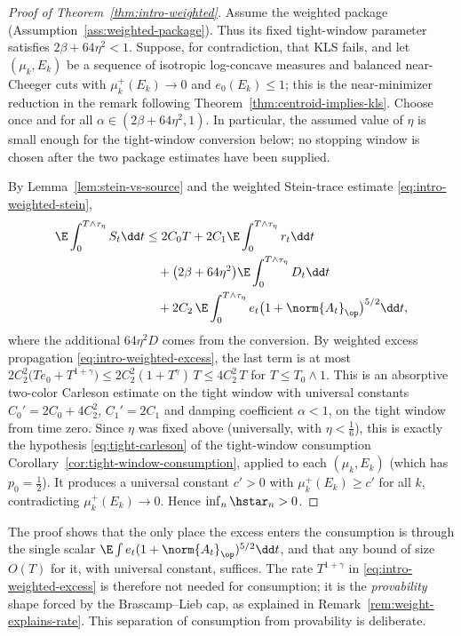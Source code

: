 \documentclass[../../main.tex]{subfiles}
\begin{document}
\begin{proof}[Proof of Theorem~\ref{thm:intro-weighted}]
Assume the weighted package (Assumption~\ref{ass:weighted-package}). Thus its fixed tight-window
parameter satisfies $2\beta+64\eta^2<1$. Suppose, for contradiction, that KLS fails, and let
$(\mu_k,E_k)$ be a sequence
of isotropic log-concave measures and balanced near-Cheeger cuts with $\mu_k^+(E_k)\to0$ and
$e_0(E_k)\le1$; this is the near-minimizer reduction in the remark following
Theorem~\ref{thm:centroid-implies-kls}. Choose once and for all
$\alpha\in(2\beta+64\eta^2,1)$.  In particular, the assumed value of $\eta$ is small enough for
the tight-window conversion below; no stopping window is chosen after the two package estimates
have been supplied.

By Lemma~\ref{lem:stein-vs-source} and the weighted Stein-trace estimate
\eqref{eq:intro-weighted-stein},
\[
\begin{aligned}
  \E\int_0^{T\wedge\tau_\eta}S_t\dd t
  &\le2C_0T+2C_1\E\int_0^{T\wedge\tau_\eta}r_t\dd t \\
  &\quad
  +\bigl(2\beta+64\eta^2\bigr)\E\int_0^{T\wedge\tau_\eta}D_t\dd t \\
  &\quad
  +2C_2\,\E\int_0^{T\wedge\tau_\eta}
  e_t\bigl(1+\norm{A_t}_\op\bigr)^{5/2}\dd t ,
\end{aligned}
\]
where the additional $64\eta^2D$ comes from the conversion. By weighted excess propagation
\eqref{eq:intro-weighted-excess}, the last term is at most
$2C_2^2\bigl(Te_0+T^{1+\gamma}\bigr)\le2C_2^2(1+T^\gamma)\,T\le4C_2^2\,T$ for $T\le T_0\wedge1$.
This is an absorptive two-color Carleson estimate on the tight window with universal constants
$C_0'=2C_0+4C_2^2$, $C_1'=2C_1$ and damping coefficient $\alpha<1$, on the tight window from
time zero. Since $\eta$ was fixed above (universally, with $\eta<\tfrac16$), this is exactly the
hypothesis \eqref{eq:tight-carleson} of the tight-window consumption
Corollary~\ref{cor:tight-window-consumption}, applied to each $(\mu_k,E_k)$ (which has
$p_0=\tfrac12$). It produces a universal constant $c'>0$ with $\mu_k^+(E_k)\ge c'$ for all $k$,
contradicting $\mu_k^+(E_k)\to0$. Hence $\inf_n\hstar_n>0$.
\end{proof}

\begin{remark}
The proof shows that the only place the excess enters the consumption is through the single
scalar $\E\int e_t(1+\norm{A_t}_\op)^{5/2}\dd t$, and that any bound of size $O(T)$ for it,
with universal constant, suffices. The rate $T^{1+\gamma}$ in
\eqref{eq:intro-weighted-excess} is therefore not needed for consumption; it is the
\emph{provability} shape forced by the Brascamp--Lieb cap, as explained in
Remark~\ref{rem:weight-explains-rate}. This separation of consumption from provability is
deliberate.
\end{remark}
\end{document}

